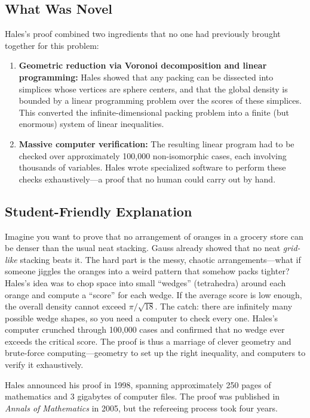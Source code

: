 \subsection{What Was Novel}
Hales's proof combined two ingredients that no one had previously brought together for this problem:
\begin{enumerate}
\item \textbf{Geometric reduction via Voronoi decomposition and linear programming:} Hales showed that any packing can be dissected into simplices whose vertices are sphere centers, and that the global density is bounded by a linear programming problem over the scores of these simplices. This converted the infinite-dimensional packing problem into a finite (but enormous) system of linear inequalities.
\item \textbf{Massive computer verification:} The resulting linear program had to be checked over approximately 100,000 non-isomorphic cases, each involving thousands of variables. Hales wrote specialized software to perform these checks exhaustively---a proof that no human could carry out by hand.
\end{enumerate}

\subsection{Student-Friendly Explanation}
Imagine you want to prove that no arrangement of oranges in a grocery store can be denser than the usual neat stacking. Gauss already showed that no neat \emph{grid-like} stacking beats it. The hard part is the messy, chaotic arrangements---what if someone jiggles the oranges into a weird pattern that somehow packs tighter? Hales's idea was to chop space into small ``wedges'' (tetrahedra) around each orange and compute a ``score'' for each wedge. If the average score is low enough, the overall density cannot exceed $\pi/\sqrt{18}$. The catch: there are infinitely many possible wedge shapes, so you need a computer to check every one. Hales's computer crunched through 100,000 cases and confirmed that no wedge ever exceeds the critical score. The proof is thus a marriage of clever geometry and brute-force computing---geometry to set up the right inequality, and computers to verify it exhaustively.

\bigskip

Hales announced his proof in 1998, spanning approximately 250 pages of mathematics and 3 gigabytes of computer files. The proof was published in \emph{Annals of Mathematics} in 2005, but the refereeing process took four years.

